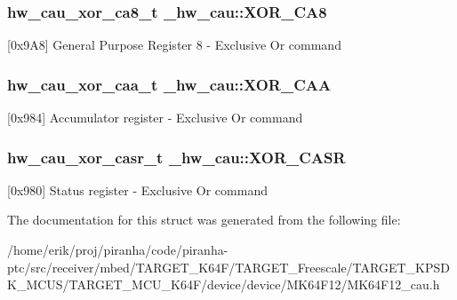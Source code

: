 \subsubsection[{\texorpdfstring{X\+O\+R\+\_\+\+C\+A8}{XOR_CA8}}]{ {\bf hw\+\_\+cau\+\_\+xor\+\_\+ca8\+\_\+t} \+\_\+hw\+\_\+cau\+::\+X\+O\+R\+\_\+\+C\+A8}\hypertarget{struct__hw__cau_af8bff406eaeeebeccc1b984c94caeaa0}{}\label{struct__hw__cau_af8bff406eaeeebeccc1b984c94caeaa0}
\mbox{[}0x9\+A8\mbox{]} General Purpose Register 8 -\/ Exclusive Or command 
\subsubsection[{\texorpdfstring{X\+O\+R\+\_\+\+C\+AA}{XOR_CAA}}]{ {\bf hw\+\_\+cau\+\_\+xor\+\_\+caa\+\_\+t} \+\_\+hw\+\_\+cau\+::\+X\+O\+R\+\_\+\+C\+AA}\hypertarget{struct__hw__cau_a37d11f4a8ba9934eeb03506410ca92a0}{}\label{struct__hw__cau_a37d11f4a8ba9934eeb03506410ca92a0}
\mbox{[}0x984\mbox{]} Accumulator register -\/ Exclusive Or command 
\subsubsection[{\texorpdfstring{X\+O\+R\+\_\+\+C\+A\+SR}{XOR_CASR}}]{ {\bf hw\+\_\+cau\+\_\+xor\+\_\+casr\+\_\+t} \+\_\+hw\+\_\+cau\+::\+X\+O\+R\+\_\+\+C\+A\+SR}\hypertarget{struct__hw__cau_a98da69cf54df01a2a119c1aa059abffb}{}\label{struct__hw__cau_a98da69cf54df01a2a119c1aa059abffb}
\mbox{[}0x980\mbox{]} Status register -\/ Exclusive Or command 

The documentation for this struct was generated from the following file\+:\begin{DoxyCompactItemize}
\item 
/home/erik/proj/piranha/code/piranha-\/ptc/src/receiver/mbed/\+T\+A\+R\+G\+E\+T\+\_\+\+K64\+F/\+T\+A\+R\+G\+E\+T\+\_\+\+Freescale/\+T\+A\+R\+G\+E\+T\+\_\+\+K\+P\+S\+D\+K\+\_\+\+M\+C\+U\+S/\+T\+A\+R\+G\+E\+T\+\_\+\+M\+C\+U\+\_\+\+K64\+F/device/device/\+M\+K64\+F12/M\+K64\+F12\+\_\+cau.\+h\end{DoxyCompactItemize}

